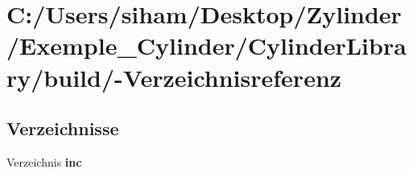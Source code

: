 \section{C:/Users/siham/Desktop/Zylinder/Exemple\_\-Cylinder/Cylinder\-Library/build/-Verzeichnisreferenz}
\label{dir_C_3A_2FUsers_2Fsiham_2FDesktop_2FZylinder_2FExemple_5FCylinder_2FCylinderLibrary_2Fbuild_2F}


\subsection*{Verzeichnisse}
\begin{CompactItemize}
\item 
Verzeichnis {\bf inc}
\end{CompactItemize}

